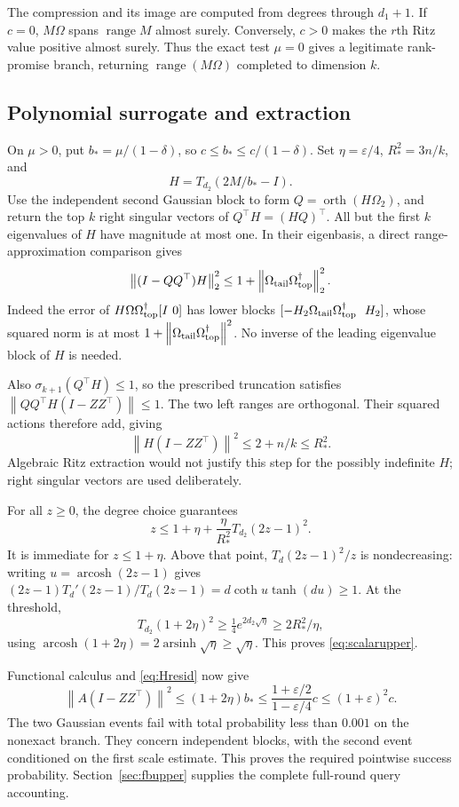 \documentclass[11pt]{article}
\theoremstyle{definition}
\newcommand{\ran}{\operatorname{range}}
\newcommand{\norm}[1]{\left\lVert#1\right\rVert}
\begin{document}
The compression and its image are computed from degrees through $d_1+1$. If $c=0$, $M\Omega$ spans $\ran M$ almost surely. Conversely, $c>0$ makes the $r$th Ritz value positive almost surely. Thus the exact test $\mu=0$ gives a legitimate rank-promise branch, returning $\ran(M\Omega)$ completed to dimension $k$.

\subsection{Polynomial surrogate and extraction}
On $\mu>0$, put $b_* =\mu/(1-\delta)$, so $c\le b_*\le c/(1-\delta)$. Set $\eta=\varepsilon/4$, $R_*^2=3n/k$, and
\[
H=T_{d_2}(2M/b_*-I).
\]
Use the independent second Gaussian block to form $Q=\operatorname{orth}(H\Omega_2)$, and return the top $k$ right singular vectors of $Q^\top H=(HQ)^\top$. All but the first $k$ eigenvalues of $H$ have magnitude at most one. In their eigenbasis, a direct range-approximation comparison gives
\[
\norm{(I-QQ^\top)H}_2^2\le1+\norm{\Omega_{\rm tail}\Omega_{\rm top}^\dagger}_2^2.
\]
Indeed the error of $H\Omega\Omega_{\rm top}^\dagger[I\ 0]$ has lower blocks $[-H_2\Omega_{\rm tail}\Omega_{\rm top}^\dagger\ \ H_2]$, whose squared norm is at most $1+\norm{\Omega_{\rm tail}\Omega_{\rm top}^\dagger}^2$. No inverse of the leading eigenvalue block of $H$ is needed.

Also $\sigma_{k+1}(Q^\top H)\le1$, so the prescribed truncation satisfies $\norm{QQ^\top H(I-ZZ^\top)}\le1$. The two left ranges are orthogonal. Their squared actions therefore add, giving
\begin{equation}\label{eq:Hresid}
\norm{H(I-ZZ^\top)}^2\le2+n/k\le R_*^2.
\end{equation}
Algebraic Ritz extraction would not justify this step for the possibly indefinite $H$; right singular vectors are used deliberately.

For all $z\ge0$, the degree choice guarantees
\begin{equation}\label{eq:scalarupper}
z\le1+\eta+\frac{\eta}{R_*^2}T_{d_2}(2z-1)^2.
\end{equation}
It is immediate for $z\le1+\eta$. Above that point, $T_d(2z-1)^2/z$ is nondecreasing: writing $u=\operatorname{arcosh}(2z-1)$ gives $(2z-1)T_d'(2z-1)/T_d(2z-1)=d\coth u\tanh(du)\ge1$. At the threshold,
\[
T_{d_2}(1+2\eta)^2\ge\tfrac14e^{2d_2\sqrt\eta}
\ge2R_*^2/\eta,
\]
using $\operatorname{arcosh}(1+2\eta)=2\operatorname{arsinh}\sqrt\eta\ge\sqrt\eta$. This proves \eqref{eq:scalarupper}.

Functional calculus and \eqref{eq:Hresid} now give
\[
\norm{A(I-ZZ^\top)}^2\le(1+2\eta)b_*
\le\frac{1+\varepsilon/2}{1-\varepsilon/4}c
\le(1+\varepsilon)^2c.
\]
The two Gaussian events fail with total probability less than $0.001$ on the nonexact branch. They concern independent blocks, with the second event conditioned on the first scale estimate. This proves the required pointwise success probability. Section~\ref{sec:fbupper} supplies the complete full-round query accounting.
\end{document}

